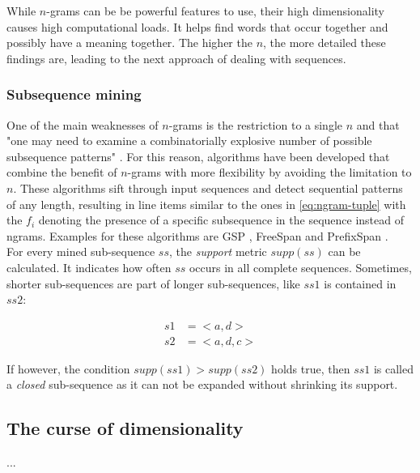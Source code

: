 While $n$-grams can be be powerful features to use, their high dimensionality causes high computational loads. It helps find words that occur together and possibly have a meaning together. The higher the $n$, the more detailed these findings are, leading to the next approach of dealing with sequences.

\subsubsection*{Subsequence mining}
One of the main weaknesses of $n$-grams is the restriction to a single $n$ and that "one may need to examine a combinatorially explosive
number of possible subsequence patterns" \cite{pei2001prefixspan}. For this reason, algorithms have been developed that combine the benefit of $n$-grams with more flexibility by avoiding the limitation to $n$. These algorithms sift through input sequences and detect sequential patterns of any length, resulting in line items similar to the ones in \autoref{eq:ngram-tuple} with the $f_i$ denoting the presence of a specific subsequence in the sequence instead of ngrams. Examples for these algorithms are GSP \cite{srikant1996gsp}, FreeSpan \cite{han2000freespan} and PrefixSpan \cite{pei2001prefixspan}.\\

For every mined sub-sequence $ss$, the \textit{support} metric $supp(ss)$ can be calculated. It indicates how often $ss$ occurs in all complete sequences. Sometimes, shorter sub-sequences are part of longer sub-sequences, like $ss1$ is contained in $ss2$:

\begin{equation*}
\begin{split}
s1 &= <a,d>\\
s2 &= <a,d,c>
\end{split}
\end{equation*}

If however, the condition $supp(ss1)>supp(ss2)$ holds true, then $ss1$ is called a \textit{closed} sub-sequence as it can not be expanded without shrinking its support.

\subsection{The curse of dimensionality}
...